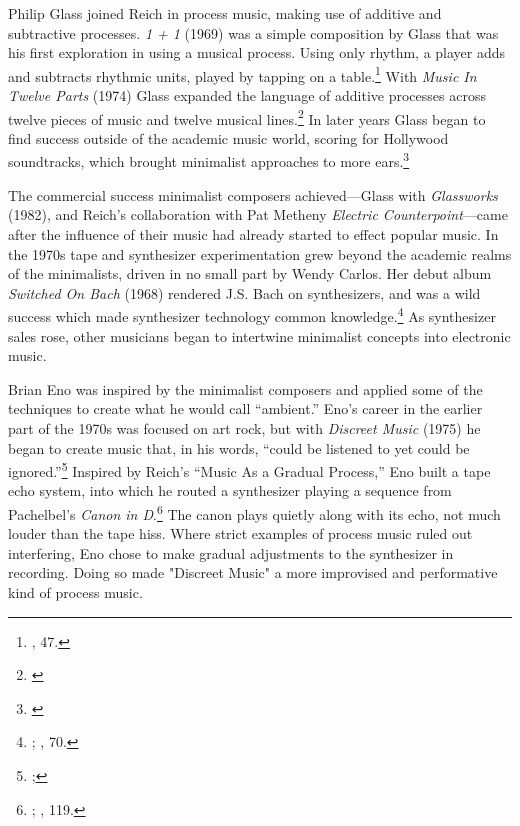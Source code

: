 \documentclass[12pt,twoside]{reedthesis}
\begin{document}
Philip Glass joined Reich in process music, making use of additive and subtractive processes. \emph{1 + 1} (1969) was a simple composition by Glass that was his first exploration in using a musical process. Using only rhythm, a player adds and subtracts rhythmic units, played by tapping on a table.\footnote{\cite{obendorfMinimalismDesigningSimplicity2009}, 47.} With \emph{Music In Twelve Parts} (1974) Glass expanded the language of additive processes across twelve pieces of music and twelve musical lines.\footnote{\cite{pageTwelvePartsPhilip}} In later years Glass began to find success outside of the academic music world, scoring for Hollywood soundtracks, which brought minimalist approaches to more ears.\footnote{\cite{evanstristanGlassPhilip}}

The commercial success minimalist composers achieved---Glass with \emph{Glassworks} (1982), and Reich's collaboration with Pat Metheny \emph{Electric Counterpoint}---came after the influence of their music had already started to effect popular music. In the 1970s tape and synthesizer experimentation grew beyond the academic realms of the minimalists, driven in no small part by Wendy Carlos. Her debut album \emph{Switched On Bach} (1968) rendered J.S. Bach on synthesizers, and was a wild success which made synthesizer technology common knowledge.\footnote{\cite{wendycarlosSwitchedOnBach1968}; \cite{prendergastAmbientCenturyMahler2000}, 70.} As synthesizer sales rose, other musicians began to intertwine minimalist concepts into electronic music.

Brian Eno was inspired by the minimalist composers and applied some of the techniques to create what he would call ``ambient.'' Eno's career in the earlier part of the 1970s was focused on art rock, but with \emph{Discreet Music} (1975) he began to create music that, in his words, ``could be listened to yet could be ignored.''\footnote{\cite{brianenoDiscreetMusic1975};\cite{enoDiscreetMusicLiner}} Inspired by Reich's ``Music As a Gradual Process,'' Eno built a tape echo system, into which he routed a synthesizer playing a sequence from Pachelbel's \emph{Canon in D}.\footnote{\cite{enoDiscreetMusicLiner}; \cite{prendergastAmbientCenturyMahler2000}, 119.} The canon plays quietly along with its echo, not much louder than the tape hiss. Where strict examples of process music ruled out interfering, Eno chose to make gradual adjustments to the synthesizer in recording. Doing so made "Discreet Music" a more improvised and performative kind of process music.
\end{document}

